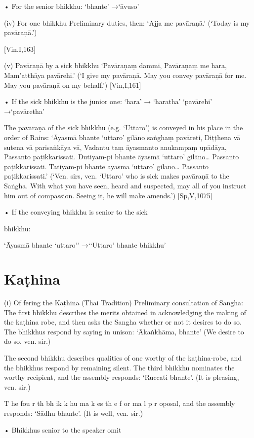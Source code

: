 • For the senior bhikkhu: ‘bhante’ →‘āvuso’

(iv) For one bhikkhu
Preliminary duties, then:
‘Ajja me pavāraṇā.’
(‘Today is my pavāraṇā.’)

[Vin,I,163]

(v) Pavāraṇā by a sick bhikkhu
‘Pavāraṇaṃ dammi,
Pavāraṇaṃ me hara,
Mam’atthāya pavārehi.’
(‘I give my pavāraṇā. May you convey pavāraṇā for
me. May you pavāraṇā on my behalf.’)
[Vin,I,161]

• If the sick bhikkhu is the junior one:
‘hara’ → ‘haratha’
‘pavārehi’ →‘pavāretha’

The pavāraṇā of the sick bhikkhu (e.g. ‘Uttaro’)
is conveyed in his place in the order of Rains:
‘Āyasmā bhante ‘uttaro’ gilāno saṅghaṃ pavāreti,
Diṭṭhena vā sutena vā parisaṅkāya vā,
Vadantu taṃ āyasmanto anukampaṃ upādāya,
Passanto paṭikkarissati.
Dutiyam-pi bhante āyasmā ‘uttaro’ gilāno…
Passanto paṭikkarissati.
Tatiyam-pi bhante āyasmā ‘uttaro’ gilāno…
Passanto paṭikkarissati.’
(‘Ven. sirs, ven. ‘Uttaro’ who is sick makes pavāraṇā
to the Saṅgha. With what you have seen, heard and
suspected, may all of you instruct him out of
compassion. Seeing it, he will make amends.’)
[Sp,V,1075]

• If the conveying bhikkhu is senior to the sick

bhikkhu:

‘Āyasmā bhante ‘uttaro’’
→‘‘Uttaro’ bhante bhikkhu’

\section{Kaṭhina}

(i) Of fering the Kaṭhina (Thai Tradition)
Preliminary consultation of Sangha:
The first bhikkhu describes the merits obtained
in acknowledging the making of the kaṭhina
robe, and then asks the Sangha whether or not
it desires to do so. The bhikkhus respond by
saying in unison:
‘Ākaṅkhāma, bhante’
(We desire to do so, ven. sir.)

The second bhikkhu describes qualities of one
worthy of the kaṭhina-robe, and the bhikkhus
respond by remaining silent.
The third bhikkhu nominates the worthy
recipient, and the assembly responds:
‘Ruccati bhante’.
(It is pleasing, ven. sir.)

T he fou r th bh ik k hu ma k es th e f or ma l p r oposal, and the assembly responds:
‘Sādhu bhante’.
(It is well, ven. sir.)

• Bhikkhus senior to the speaker omit

